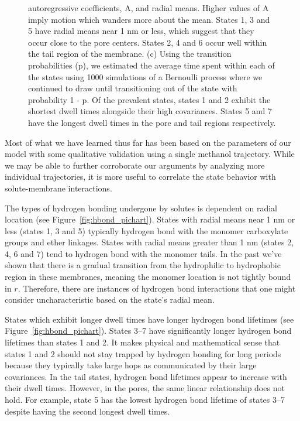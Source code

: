 \documentclass[journal=jpcbfk,manuscript=article]{achemso}
\begin{document}
\begin{figure}
{  autoregressive coefficients, A, and radial means. Higher values of A imply motion which wanders 
  more about the mean. States 1, 3 and 5 have radial means near 1 nm or less, which suggest that they
  occur close to the pore centers. States 2, 4 and 6 occur well within the tail region of the membrane.
  (c) Using the transition probabilities (p), we estimated the average time spent within each 
  of the states using 1000 simulations of a Bernoulli process where we continued to draw until transitioning
  out of the state with probability 1 - p. Of the prevalent states, states 1 and 
  2 exhibit the shortest dwell times alongside their high covariances. States 5 and 7 have the longest dwell times in the pore and tail regions respectively.
  }\label{fig:common_states_MET}
  \end{figure}
  
  Most of what we have learned thus far has been based on the parameters of our
  model with some qualitative validation using a single methanol trajectory. While 
  we may be able to further corroborate our arguments by analyzing more
  individual trajectories, it is more useful to correlate the state behavior with
  solute-membrane interactions.

  The types of hydrogen bonding undergone by solutes is dependent on radial
  location (see Figure~\ref{fig:hbond_pichart}). States with radial means near 1 nm
  or less (states 1, 3 and 5) typically hydrogen bond with the monomer carboxylate
  groups and ether linkages. States with radial means greater than 1 nm (states 2,
  4, 6 and 7) tend to hydrogen bond with the monomer tails. In the past we've shown
  that there is a gradual transition from the hydrophilic to hydrophobic region in
  these membranes, meaning the monomer location is not tightly bound in $r$. Therefore,
  there are instances of hydrogen bond interactions that one might consider 
  uncharacteristic based on the state's radial mean.
  
  States which exhibit longer dwell times have longer hydrogen bond lifetimes (see
  Figure~\ref{fig:hbond_pichart}). States 3--7 have significantly longer hydrogen 
  bond lifetimes than states 1 and 2. It makes physical and mathematical sense that
  states 1 and 2 should not stay trapped by hydrogen bonding for long periods because
  they typically take large hops as communicated by their large covariances.
  In the tail states, hydrogen bond lifetimes appear to increase with their dwell 
  times. However, in the pores, the same linear relationship does not hold.
  For example, state 5 has the lowest hydrogen bond lifetime of states 3--7
  despite having the second longest dwell times. 
  
\end{document}
